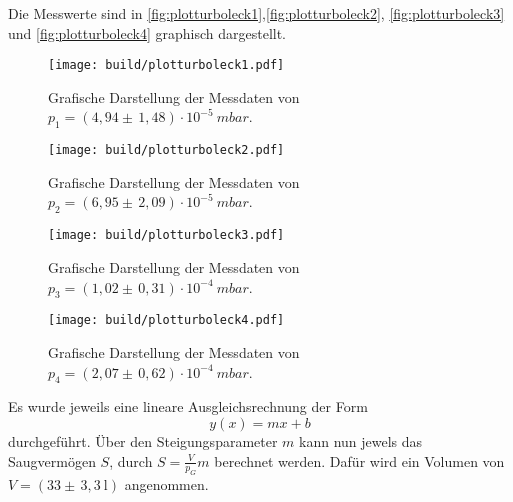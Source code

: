 \noindent
Die Messwerte sind in \autoref{fig:plotturboleck1},\autoref{fig:plotturboleck2}, \autoref{fig:plotturboleck3} und \autoref{fig:plotturboleck4} graphisch dargestellt.


\begin{figure}[H]
    \centering
    \texttt{[image: build/plotturboleck1.pdf]}
    \caption{Grafische Darstellung der Messdaten von $p_1 = (4,94 \pm \, 1,48)\cdot 10^{-5} \: \si{mbar}$.}
    \label{fig:plotturboleck1}
\end{figure}

\begin{figure}[H]
  \centering
  \texttt{[image: build/plotturboleck2.pdf]}
  \caption{Grafische Darstellung der Messdaten von $p_2 = (6,95 \pm \, 2,09)\cdot 10^{-5} \: \si{mbar}$.}
  \label{fig:plotturboleck2}
\end{figure}

\begin{figure}[H]
  \centering
  \texttt{[image: build/plotturboleck3.pdf]}
  \caption{Grafische Darstellung der Messdaten von $p_3 = (1,02 \pm \, 0,31)\cdot 10^{-4} \: \si{mbar}$.}
  \label{fig:plotturboleck3}
\end{figure}

\begin{figure}[H]
\centering
\texttt{[image: build/plotturboleck4.pdf]}
\caption{Grafische Darstellung der Messdaten von $p_4 = (2,07 \pm \, 0,62)\cdot 10^{-4} \: \si{mbar}$.}
\label{fig:plotturboleck4}
\end{figure}

\noindent
Es wurde jeweils eine lineare Ausgleichsrechnung der Form
\begin{equation}
	y(x)=mx+b
\end{equation}
durchgeführt. Über den Steigungsparameter $m$ kann nun jewels das Saugvermögen $S$, durch $S=\frac{V}{p_G}m$ berechnet werden. Dafür wird ein Volumen
von $V = (33 \pm \, 3,3 \: \si{\litre})$ angenommen.

